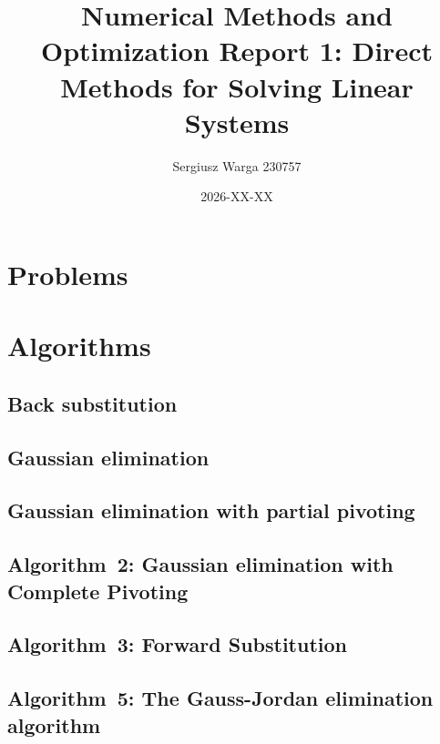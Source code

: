\documentclass[a4paper]{article}
\title{Numerical Methods and Optimization Report 1:
  Direct Methods for Solving Linear Systems}
\author{Sergiusz Warga 230757}
\date{2026-XX-XX}
\begin{document}
\maketitle
\tableofcontents
\pagebreak

\section{Problems}









\clearpage

\section{Algorithms}
\subsection{Back substitution}%
\label{algorithm:back_substitution}

\subsection{Gaussian elimination}%
\label{algorithm:gaussian_elimination}

\subsection{Gaussian elimination with partial pivoting}
\label{algorithm:gaussian_elimination_with_partial_pivoting}
\subsection{Algorithm~2: Gaussian elimination with Complete Pivoting}%
\label{algorithm:2}

\subsection{Algorithm~3: Forward Substitution}%
\label{algorithm:3}

\subsection{Algorithm~5: The Gauss-Jordan elimination algorithm}%
\label{algorithm:5}

\end{document}
